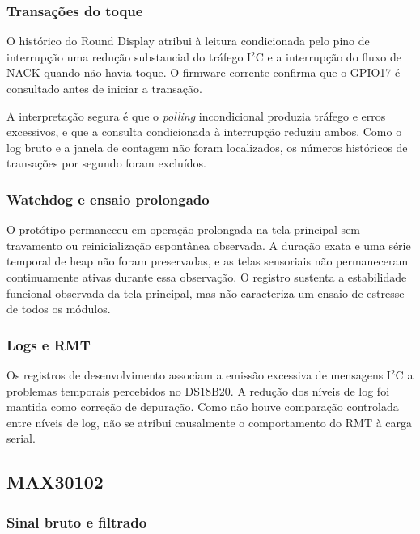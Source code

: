 \documentclass[a4paper,12pt]{article}
\begin{document}
\subsubsection{Transa\c{c}\~oes do toque}


O hist\'orico do Round Display atribui \`a leitura condicionada pelo pino de interrup\c{c}\~ao uma redu\c{c}\~ao substancial do tr\'afego I$^2$C e a interrup\c{c}\~ao do fluxo de NACK quando n\~ao havia toque. O firmware corrente confirma que o GPIO17 \'e consultado antes de iniciar a transa\c{c}\~ao.


A interpreta\c{c}\~ao segura \'e que o \emph{polling} incondicional produzia tr\'afego e erros excessivos, e que a consulta condicionada \`a interrup\c{c}\~ao reduziu ambos. Como o log bruto e a janela de contagem n\~ao foram localizados, os n\'umeros hist\'oricos de transa\c{c}\~oes por segundo foram exclu\'idos.


\subsubsection{Watchdog e ensaio prolongado}

O prot\'otipo permaneceu em opera\c{c}\~ao prolongada na tela principal sem travamento ou reinicializa\c{c}\~ao espont\^anea observada. A dura\c{c}\~ao exata e uma s\'erie temporal de heap n\~ao foram preservadas, e as telas sensoriais n\~ao permaneceram continuamente ativas durante essa observa\c{c}\~ao. O registro sustenta a estabilidade funcional observada da tela principal, mas n\~ao caracteriza um ensaio de estresse de todos os m\'odulos.


\subsubsection{Logs e RMT}


Os registros de desenvolvimento associam a emiss\~ao excessiva de mensagens I$^2$C a problemas temporais percebidos no DS18B20. A redu\c{c}\~ao dos n\'iveis de log foi mantida como corre\c{c}\~ao de depura\c{c}\~ao. Como n\~ao houve compara\c{c}\~ao controlada entre n\'iveis de log, n\~ao se atribui causalmente o comportamento do RMT \`a carga serial.


\subsection{MAX30102}


\subsubsection{Sinal bruto e filtrado}
\end{document}
